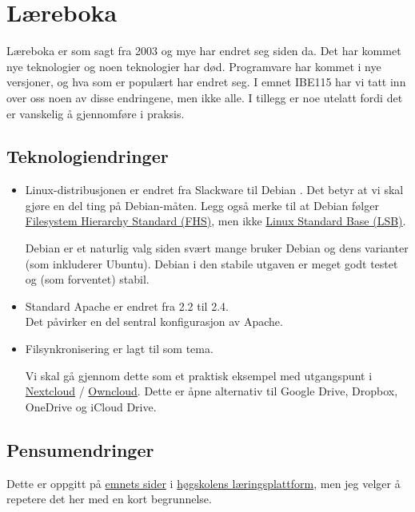 \chapter{Læreboka}

Læreboka er som sagt fra 2003 og mye har endret seg siden da.
Det har kommet nye teknologier og noen teknologier har død.
Programvare har kommet i nye versjoner, og hva som er populært 
har endret seg. I emnet IBE115 har vi tatt inn over oss noen
av disse endringene, men ikke alle. I tillegg er noe utelatt
fordi det er vanskelig å gjennomføre i praksis.

\section{Teknologiendringer}

\begin{itemize}
\item Linux-distribusjonen er endret fra Slackware til Debian
    . Det betyr at vi skal gjøre
    en del ting på Debian-måten. Legg også merke til at Debian
    følger \href{https://en.wikipedia.org/wiki/Filesystem_Hierarchy_Standard}{Filesystem Hierarchy Standard (FHS)}, 
    men ikke \href{https://en.wikipedia.org/wiki/Linux_Standard_Base}{Linux Standard Base (LSB)}.

    Debian er et naturlig valg siden svært mange bruker Debian 
    og dens varianter (som inkluderer Ubuntu). Debian i den stabile
    utgaven er meget godt testet og (som forventet) stabil.
\item Standard Apache er endret fra 2.2 til 2.4.\\
    Det påvirker en del sentral konfigurasjon av Apache.
\item Filsynkronisering er lagt til som tema.

    Vi skal gå gjennom dette som et praktisk eksempel med utgangspunt i 
    \href{https://nextcloud.com/}{Nextcloud} / \href{https://owncloud.org/}{Owncloud}.
    Dette er åpne alternativ til Google Drive, Dropbox, OneDrive og iCloud Drive. 
\end{itemize}


\section{Pensumendringer}
Dette er oppgitt på \href{https://himolde.instructure.com/courses/73}{emnets sider} i 
\href{https://himolde.instructure.com/}{høgskolens læringsplattform}, 
men jeg velger å repetere det her med en kort begrunnelse.

